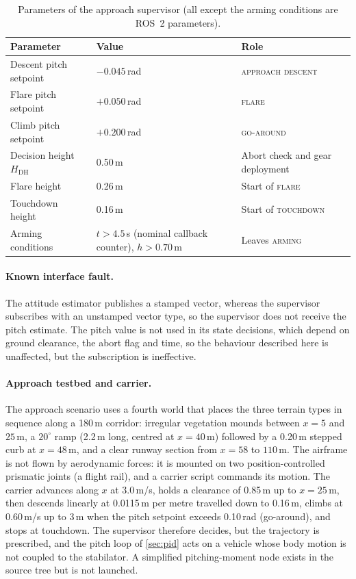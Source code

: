 \documentclass[11pt,a4paper]{article}
\begin{document}
\begin{table}[ht]
\centering
\small
\begin{tabular}{@{}L{5.0cm} L{4.8cm} L{5.0cm}@{}}
\toprule
\textbf{Parameter} & \textbf{Value} & \textbf{Role}\\
\midrule
Descent pitch setpoint & $-0.045$\,rad & \textsc{approach descent}\\
Flare pitch setpoint & $+0.050$\,rad & \textsc{flare}\\
Climb pitch setpoint & $+0.200$\,rad & \textsc{go-around}\\
Decision height $H_{\mathrm{DH}}$ & 0.50\,m & Abort check and gear deployment\\
Flare height & 0.26\,m & Start of \textsc{flare}\\
Touchdown height & 0.16\,m & Start of \textsc{touchdown}\\
Arming conditions & $t>4.5$\,s (nominal callback counter), $h>0.70$\,m & Leaves \textsc{arming}\\
\bottomrule
\end{tabular}
\caption{Parameters of the approach supervisor (all except the arming conditions are ROS~2 parameters).}
\label{tab:supparams}
\end{table}
 
\paragraph{Known interface fault.} The attitude estimator publishes a stamped vector, whereas the supervisor subscribes with an unstamped vector type, so the supervisor does not receive the pitch estimate. The pitch value is not used in its state decisions, which depend on ground clearance, the abort flag and time, so the behaviour described here is unaffected, but the subscription is ineffective.
 
\paragraph{Approach testbed and carrier.} The approach scenario uses a fourth world that places the three terrain types in sequence along a 180\,m corridor: irregular vegetation mounds between $x=5$ and $25$\,m, a $20^\circ$ ramp (2.2\,m long, centred at $x=40$\,m) followed by a 0.20\,m stepped curb at $x=48$\,m, and a clear runway section from $x=58$ to $110$\,m. The airframe is not flown by aerodynamic forces: it is mounted on two position-controlled prismatic joints (a flight rail), and a carrier script commands its motion. The carrier advances along $x$ at 3.0\,m/s, holds a clearance of 0.85\,m up to $x=25$\,m, then descends linearly at 0.0115\,m per metre travelled down to 0.16\,m, climbs at 0.60\,m/s up to 3\,m when the pitch setpoint exceeds 0.10\,rad (go-around), and stops at touchdown. The supervisor therefore decides, but the trajectory is prescribed, and the pitch loop of \cref{sec:pid} acts on a vehicle whose body motion is not coupled to the stabilator. A simplified pitching-moment node exists in the source tree but is not launched.
 
\end{document}
